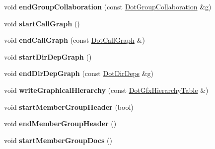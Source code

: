 \begin{DoxyCompactItemize}
\item 
\hypertarget{class_r_t_f_generator_abf4d1f5c7a6de661874865317e848973}{void {\bfseries end\-Group\-Collaboration} (const \hyperlink{class_dot_group_collaboration}{Dot\-Group\-Collaboration} \&g)}\label{class_r_t_f_generator_abf4d1f5c7a6de661874865317e848973}

\item 
\hypertarget{class_r_t_f_generator_a8b9ae07c2a7ca51c0100e5258c16b663}{void {\bfseries start\-Call\-Graph} ()}\label{class_r_t_f_generator_a8b9ae07c2a7ca51c0100e5258c16b663}

\item 
\hypertarget{class_r_t_f_generator_a93d8bcfaeaaa615386cf736ad2f2259b}{void {\bfseries end\-Call\-Graph} (const \hyperlink{class_dot_call_graph}{Dot\-Call\-Graph} \&)}\label{class_r_t_f_generator_a93d8bcfaeaaa615386cf736ad2f2259b}

\item 
\hypertarget{class_r_t_f_generator_a071f06d58679ecf7077e1bb4335b798c}{void {\bfseries start\-Dir\-Dep\-Graph} ()}\label{class_r_t_f_generator_a071f06d58679ecf7077e1bb4335b798c}

\item 
\hypertarget{class_r_t_f_generator_a074b02c465c6db3a6252095c906511ab}{void {\bfseries end\-Dir\-Dep\-Graph} (const \hyperlink{class_dot_dir_deps}{Dot\-Dir\-Deps} \&g)}\label{class_r_t_f_generator_a074b02c465c6db3a6252095c906511ab}

\item 
\hypertarget{class_r_t_f_generator_a74e60d52299a8b1d0e08397d3d362f48}{void {\bfseries write\-Graphical\-Hierarchy} (const \hyperlink{class_dot_gfx_hierarchy_table}{Dot\-Gfx\-Hierarchy\-Table} \&)}\label{class_r_t_f_generator_a74e60d52299a8b1d0e08397d3d362f48}

\item 
\hypertarget{class_r_t_f_generator_ab9d164d85715527cff385a3d599ccf7b}{void {\bfseries start\-Member\-Group\-Header} (bool)}\label{class_r_t_f_generator_ab9d164d85715527cff385a3d599ccf7b}

\item 
\hypertarget{class_r_t_f_generator_a7e1a44a13d8b22dc7929a9cdbd94b725}{void {\bfseries end\-Member\-Group\-Header} ()}\label{class_r_t_f_generator_a7e1a44a13d8b22dc7929a9cdbd94b725}

\item 
\hypertarget{class_r_t_f_generator_aa8c7357f48d452ccd00a331623c4674a}{void {\bfseries start\-Member\-Group\-Docs} ()}\label{class_r_t_f_generator_aa8c7357f48d452ccd00a331623c4674a}


\end{DoxyCompactItemize}
